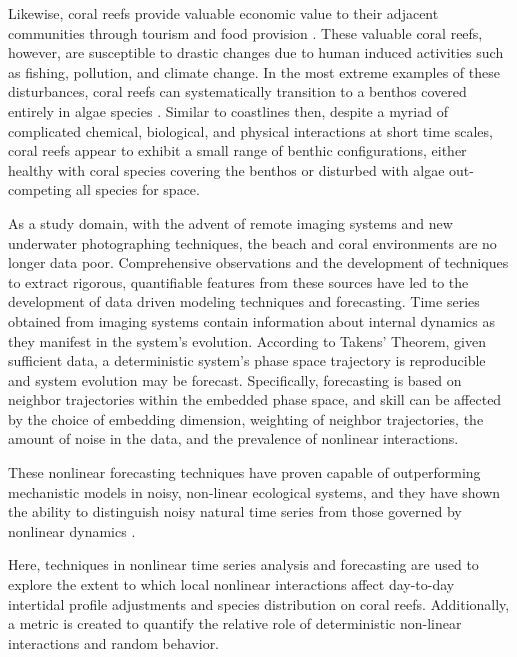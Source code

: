 Likewise, coral reefs provide valuable economic value to their adjacent communities through tourism and food provision \cite{coral_economics}. These valuable coral reefs, however, are susceptible to drastic changes due to human induced activities such as fishing, pollution, and climate change\cite{coral_degredation}.  In the most extreme examples of these disturbances, coral reefs can systematically transition to a benthos covered entirely in algae species \cite{coral_degredation}.  Similar to coastlines then, despite a myriad of complicated chemical, biological, and physical interactions at short time scales, coral reefs appear to exhibit a small range of benthic configurations, either healthy with coral species covering the benthos or disturbed with algae out-competing all species for space\cite{phase_shifts}. 

As a study domain, with the advent of remote imaging systems and new underwater photographing techniques, the beach and coral environments are no longer data poor\cite{beach_imagery}. Comprehensive observations and the development of techniques to extract rigorous, quantifiable features from these sources have led to the development of data driven modeling techniques and forecasting\cite{beach_predicting}. Time series obtained from imaging systems contain information about internal dynamics as they manifest in the system’s evolution\cite{beach_attractor}. According to Takens’ Theorem, given sufficient data, a deterministic system’s phase space trajectory is reproducible and system evolution may be forecast\cite{original_rubin}\cite{chaotic_analysis}. Specifically, forecasting is based on neighbor trajectories within the embedded phase space, and skill can be affected by the choice of embedding dimension, weighting of neighbor trajectories, the amount of noise in the data, and the prevalence of nonlinear interactions\cite{Embedology}\cite{measurement_error_vs_chaos}.

These nonlinear forecasting techniques have proven capable of outperforming mechanistic models in noisy, non-linear ecological systems, and they have shown the ability to distinguish noisy natural time series from those governed by nonlinear dynamics \cite{natural_series_classification} \cite{rubin_lagged_vals}. 

Here, techniques in nonlinear time series analysis and forecasting are used to explore the extent to which local nonlinear interactions affect day-to-day intertidal profile adjustments and species distribution on coral reefs. Additionally, a metric is created to quantify the relative role of deterministic non-linear interactions and random behavior.   
